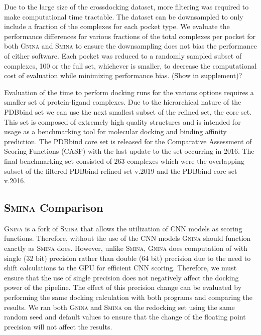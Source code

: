 \documentclass[journal=jcisd8,manuscript=article]{achemso}
\begin{document}
Due to the large size of the crossdocking dataset, more filtering was required to make computational time tractable. The dataset can be downsampled to only include a fraction of the complexes for each pocket type. We evaluate the performance differences for various fractions of the total complexes per pocket for both \textsc{Gnina} and \textsc{Smina} to ensure the downsampling does not bias the performance of either software. Each pocket was reduced to a randomly sampled subset of complexes, 100 or the full set, whichever is smaller, to decrease the computational cost of evaluation while minimizing performance bias. (Show in supplement)? 

Evaluation of the time to perform docking runs for the various options requires a smaller set of protein-ligand complexes. Due to the hierarchical nature of the PDBbind set we can use the next smallest subset of the refined set, the core set. This set is composed of extremely high quality structures and is intended for usage as a benchmarking tool for molecular docking and binding affinity prediction. The PDBbind core set is released for the Comparative Assessment of Scoring Functions (CASF) with the last update to the set occurring in 2016. The final benchmarking set consisted of $263$ complexes which were the overlapping subset of the filtered PDBbind refined set v.2019 and the PDBbind core set v.2016.

\subsection{\textsc{Smina} Comparison}
\textsc{Gnina} is a fork of \textsc{Smina} that allows the utilization of CNN models as scoring functions. Therefore, without the use of the CNN models \textsc{Gnina} should function exactly as \textsc{Smina} does. However, unlike \textsc{Smina}, \textsc{Gnina} does computation of with single (32 bit) precision rather than double (64 bit) precision due to the need to shift calculations to the GPU for efficient CNN scoring. Therefore, we must ensure that the use of single precision does not negatively affect the docking power of the pipeline. The effect of this precision change can be evaluated by performing the same docking calculation with both programs and comparing the results. We ran both \textsc{Gnina} and \textsc{Smina} on the redocking set using the same random seed and default values to ensure that the change of the floating point precision will not affect the results. 
\end{document}
